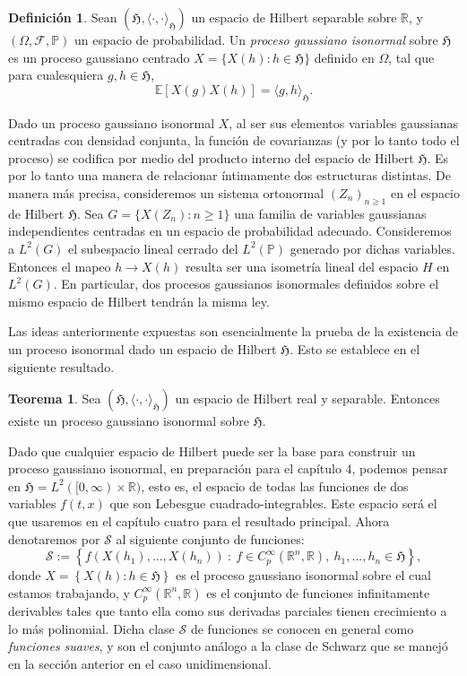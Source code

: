 \documentclass[letterpaper,twoside,12pt]{book}
\newcommand{\R}{\mathbb{R}}
\newcommand{\F}{\mathcal{F}}
\renewcommand{\S}{\mathcal{S}}
\newcommand{\E}{\mathbb{E}}
\renewcommand{\P}{\mathbb{P}}
\newcommand{\1}{\mathds{1}}
\renewcommand{\to}{\rightarrow}
\theoremstyle{definition}
\newtheorem{dfn}{Definición}
\theoremstyle{definition}
\newtheorem{teo}{Teorema}
\theoremstyle{remark}
\theoremstyle{definition}
\theoremstyle{definition}
\theoremstyle{definition}
\theoremstyle{definition}
\theoremstyle{definition}
\begin{document}
\begin{dfn} 
 Sean $(\mathfrak{H},\langle\cdot,\cdot\rangle_{\mathfrak{H}})$ un espacio de Hilbert separable sobre $\R$, y $(\Omega,\F,\P)$ un espacio de probabilidad. Un \textit{proceso gaussiano isonormal} sobre $\mathfrak{H}$ es un proceso gaussiano centrado $X=\{X(h):h\in \mathfrak{H}\}$ definido en $\Omega$, tal que para cualesquiera $g, h\in \mathfrak{H}$, 
 \[
 \E\left[X(g)X(h)\right]=\langle g,h\rangle_{\mathfrak{H}}.
 \]
 \end{dfn}
Dado un proceso gaussiano isonormal $X$, al ser sus elementos variables gaussianas centradas con densidad conjunta, la función de covarianzas (y por lo tanto todo el proceso) se codifica por medio del producto interno del espacio de Hilbert $\mathfrak{H}$. Es por lo tanto una manera de relacionar íntimamente dos estructuras distintas. De manera más precisa, consideremos un sistema ortonormal $(Z_n)_{n\geq1}$ en el espacio de Hilbert $\mathfrak{H}$. Sea $G=\{X(Z_n):n\geq1\}$ una familia de variables gaussianas independientes centradas en un espacio de probabilidad adecuado. Consideremos a $L^2(G)$ el subespacio lineal cerrado del $L^2(\P)$ generado por dichas variables. Entonces el mapeo $h\to X(h)$ resulta ser una isometría lineal del espacio $H$ en $L^2(G)$. En particular, dos procesos gaussianos isonormales definidos sobre el mismo espacio de Hilbert tendrán la misma ley.

Las ideas anteriormente expuestas son esencialmente la prueba de la existencia de un proceso isonormal dado un espacio de Hilbert $\mathfrak{H}$. Esto se establece en el siguiente resultado.

\begin{teo} 
Sea $(\mathfrak{H},\langle\cdot,\cdot\rangle_{\mathfrak{H}})$ un espacio de Hilbert real y separable. Entonces existe un proceso gaussiano isonormal sobre $\mathfrak{H}$.
\end{teo}

Dado que cualquier espacio de Hilbert puede ser la base para construir un proceso gaussiano isonormal, en preparación para el capítulo 4, podemos pensar en $\mathfrak{H}=L^2([0,\infty)\times \R)$, esto es, el espacio de todas las funciones de dos variables $f(t,x)$ que son Lebesgue cuadrado-integrables. Este espacio será el que usaremos en el capítulo cuatro para el resultado principal. Ahora denotaremos por $\S$ al siguiente conjunto de funciones:
\[
\S:=\left\{f(X(h_1),...,X(h_n)) \ : \ f\in C^{\infty}_p(\R^{n},\R), \ h_1,...,h_n\in \mathfrak{H} \right\},
\]
donde $X=\left\{X(h):h\in \mathfrak{H}\right\}$ es el proceso gaussiano isonormal sobre el cual estamos trabajando, y $C^{\infty}_p(\R^{n},\R)$ es el conjunto de funciones infinitamente derivables tales que tanto ella como sus derivadas parciales tienen crecimiento a lo más polinomial. Dicha clase $\S$ de funciones se conocen en general como \textit{funciones suaves}, y son el conjunto análogo a la clase de Schwarz que se manejó en la sección anterior en el caso unidimensional.
\end{document}
